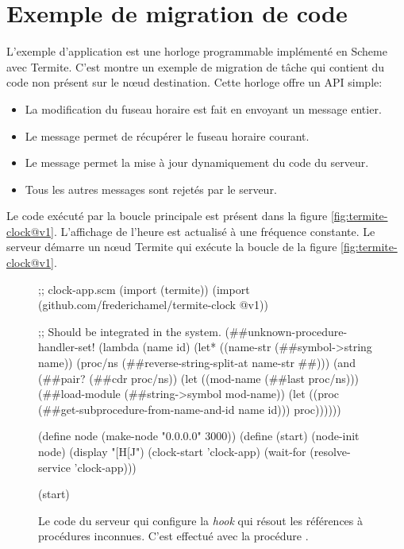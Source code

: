 \section{Exemple de migration de code}

L'exemple d'application est une horloge programmable implémenté
en Scheme avec Termite. C'est montre un exemple de migration
de tâche qui contient du code non présent sur le nœud destination.
Cette horloge offre un API simple:
\begin{itemize}
  \item La modification du fuseau horaire est fait en envoyant
    un message entier.

  \item Le message  permet de récupérer
    le fuseau horaire courant.

  \item Le message  permet la mise à jour
    dynamiquement du code du serveur.

  \item Tous les autres messages sont rejetés par le serveur.
\end{itemize}

Le code exécuté par la boucle principale est présent dans la figure
\ref{fig:termite-clock@v1}. L'affichage de l'heure est actualisé à
une fréquence constante. Le serveur démarre un nœud Termite qui
exécute la boucle de la figure \ref{fig:termite-clock@v1}.

\begin{figure}[h!]
\begin{center}
\begin{mplisting}{1}
;; clock-app.scm
(import (termite))
(import (github.com/frederichamel/termite-clock @v1))

;; Should be integrated in the system.
(##unknown-procedure-handler-set!
  (lambda (name id)
    (let* ((name-str (##symbol->string name))
           (proc/ns (##reverse-string-split-at name-str #\#)))
      (and (##pair? (##cdr proc/ns))
           (let ((mod-name (##last proc/ns)))
             (##load-module (##string->symbol mod-name))
             (let ((proc (##get-subprocedure-from-name-and-id name id)))
               proc))))))

(define node (make-node "0.0.0.0" 3000))
(define (start)
  (node-init node)
  (display "[H[J")
  (clock-start 'clock-app)
  (wait-for (resolve-service 'clock-app)))

(start)
\end{mplisting}
\end{center}
  \caption{Le code du serveur qui configure la \textit{hook}
    qui résout les références à procédures inconnues.
    C'est effectué avec la procédure .
    }
  \vspace*{4ex}
\end{figure}


